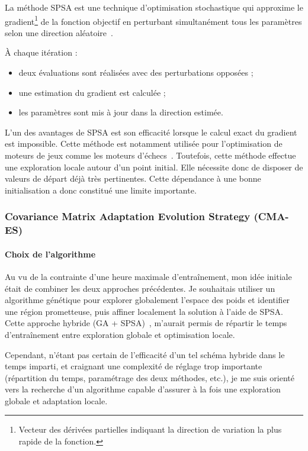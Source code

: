 \documentclass[11pt,a4paper]{article}
\begin{document}
La méthode SPSA est une technique d'optimisation stochastique qui approxime le gradient\footnote{Vecteur des dérivées partielles indiquant la direction de variation la plus rapide de la fonction.} de la fonction objectif en perturbant
simultanément tous les paramètres selon une direction aléatoire~\cite{Spall1998,WikiSPSA}.

À chaque itération :

\begin{itemize}
  \item deux évaluations sont réalisées avec des perturbations opposées ;
  \item une estimation du gradient est calculée ;
  \item les paramètres sont mis à jour dans la direction estimée.
\end{itemize}

L'un des avantages de SPSA est son efficacité lorsque le calcul exact du gradient est impossible. Cette méthode est notamment utilisée
pour l'optimisation de moteurs de jeux comme les moteurs d'échecs~\cite{FishtestSPSA}. Toutefois, cette méthode 
effectue une exploration locale autour d'un point initial. Elle nécessite donc de disposer de valeurs de départ déjà très pertinentes. Cette dépendance à une bonne initialisation a donc constitué
une limite importante.

\subsubsection{Covariance Matrix Adaptation Evolution Strategy (CMA-ES)}

\paragraph{Choix de l’algorithme}

Au vu de la contrainte d'une heure maximale d'entraînement, mon idée initiale était de combiner les deux approches précédentes.
Je souhaitais utiliser un algorithme génétique pour explorer globalement l'espace des poids et identifier une région
prometteuse, puis affiner localement la solution à l'aide de SPSA. Cette approche hybride (GA + SPSA)~\cite{Sahu2010}, m'aurait permis de
répartir le temps d'entraînement entre exploration globale et optimisation locale.

Cependant, n'étant pas certain de l'efficacité d'un tel schéma hybride dans le temps imparti, et craignant une complexité de
réglage trop importante (répartition du temps, paramétrage des deux méthodes, etc.), je me suis orienté vers la recherche
d'un algorithme capable d'assurer à la fois une exploration globale et adaptation locale.
\end{document}
